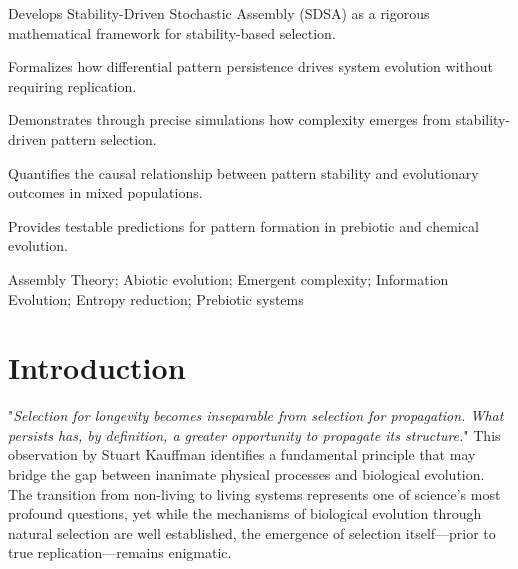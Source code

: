 \documentclass[preprint,12pt]{elsarticle}
\begin{document}
\begin{frontmatter}
\begin{highlights}
\item Develops Stability-Driven Stochastic Assembly (SDSA) as a rigorous mathematical framework for stability-based selection.
\item Formalizes how differential pattern persistence drives system evolution without requiring replication.
\item Demonstrates through precise simulations how complexity emerges from stability-driven pattern selection.
\item Quantifies the causal relationship between pattern stability and evolutionary outcomes in mixed populations.
\item Provides testable predictions for pattern formation in prebiotic and chemical evolution.
\end{highlights}

\begin{keyword}
Assembly Theory; Abiotic evolution; Emergent complexity; Information Evolution; Entropy reduction; Prebiotic systems



\end{keyword}

\end{frontmatter}


\section{Introduction}

"\textit{Selection for longevity becomes inseparable from selection for propagation. What persists has, by definition, a greater opportunity to propagate its structure.}" This observation by Stuart Kauffman \cite{kauffman1995home} identifies a fundamental principle that may bridge the gap between inanimate physical processes and biological evolution. The transition from non-living to living systems represents one of science's most profound questions, yet while the mechanisms of biological evolution through natural selection are well established, the emergence of selection itself—prior to true replication—remains enigmatic.
\end{document}
